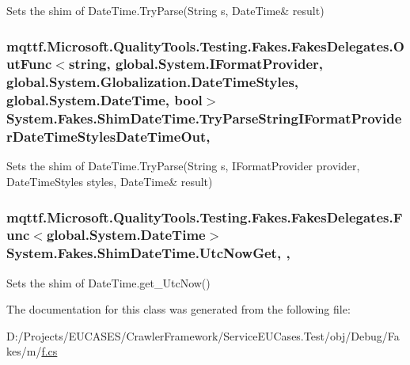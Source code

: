 Sets the shim of Date\-Time.\-Try\-Parse(String s, Date\-Time\& result)

\hypertarget{class_system_1_1_fakes_1_1_shim_date_time_aa3a1f9b515db5f5c2990c5dc278a9858}{
\subsubsection[{Try\-Parse\-String\-I\-Format\-Provider\-Date\-Time\-Styles\-Date\-Time\-Out}]{\setlength{\rightskip}{0pt plus 5cm}mqttf.\-Microsoft.\-Quality\-Tools.\-Testing.\-Fakes.\-Fakes\-Delegates.\-Out\-Func$<$string, global.\-System.\-I\-Format\-Provider, global.\-System.\-Globalization.\-Date\-Time\-Styles, global.\-System.\-Date\-Time, bool$>$ System.\-Fakes.\-Shim\-Date\-Time.\-Try\-Parse\-String\-I\-Format\-Provider\-Date\-Time\-Styles\-Date\-Time\-Out\hspace{0.3cm}{\ttfamily [static]}, {\ttfamily [set]}}}\label{class_system_1_1_fakes_1_1_shim_date_time_aa3a1f9b515db5f5c2990c5dc278a9858}


Sets the shim of Date\-Time.\-Try\-Parse(String s, I\-Format\-Provider provider, Date\-Time\-Styles styles, Date\-Time\& result)

\hypertarget{class_system_1_1_fakes_1_1_shim_date_time_ae70a386e8539caf306651c98c16e5107}{
\subsubsection[{Utc\-Now\-Get}]{\setlength{\rightskip}{0pt plus 5cm}mqttf.\-Microsoft.\-Quality\-Tools.\-Testing.\-Fakes.\-Fakes\-Delegates.\-Func$<$global.\-System.\-Date\-Time$>$ System.\-Fakes.\-Shim\-Date\-Time.\-Utc\-Now\-Get\hspace{0.3cm}{\ttfamily [static]}, {\ttfamily [get]}, {\ttfamily [set]}}}\label{class_system_1_1_fakes_1_1_shim_date_time_ae70a386e8539caf306651c98c16e5107}


Sets the shim of Date\-Time.\-get\-\_\-\-Utc\-Now()



The documentation for this class was generated from the following file\-:\begin{DoxyCompactItemize}
\item 
D\-:/\-Projects/\-E\-U\-C\-A\-S\-E\-S/\-Crawler\-Framework/\-Service\-E\-U\-Cases.\-Test/obj/\-Debug/\-Fakes/m/\hyperlink{m_2f_8cs}{f.\-cs}\end{DoxyCompactItemize}
